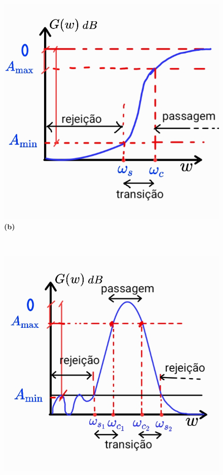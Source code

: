 \begin{figure}[h!]
\begin{minipage}[b]{0.32\linewidth}
        \includegraphics[width=\linewidth]{figuras/passa_altas_real.png}
        \centering
        \\ \textbf{(b)}
    \end{minipage}
    \\
    \begin{minipage}[b]{0.32\linewidth}     
        \includegraphics[width=\linewidth]{figuras/passa_faixa_real.png}

\end{minipage}
\end{figure}
